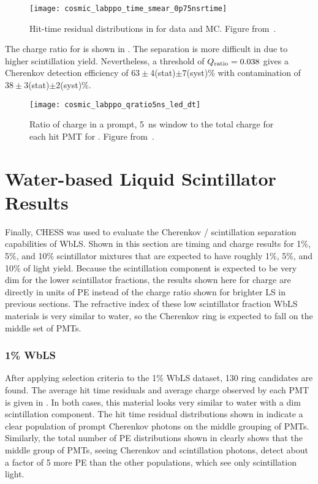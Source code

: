 \begin{figure}
	\centering
	\texttt{[image: cosmic\_labppo\_time\_smear\_0p75nsrtime]}
	\caption{Hit-time residual distributions in {\labppo} for data and MC. Figure from~\cite{chess_lab}.}
	\label{fig:labppo}
\end{figure}

The charge ratio for {\labppo} is shown in . 
The separation is more difficult in {\labppo} due to higher scintillation yield.  
Nevertheless, a threshold of $Q_{\rm ratio}=0.038$ gives a Cherenkov detection efficiency of $63\pm4$(stat)$\pm7$(syst)\% with contamination of $38\pm3$(stat)$\pm2$(syst)\%.

\begin{figure}
	\centering
	\texttt{[image: cosmic\_labppo\_qratio5ns\_led\_dt]}
	\caption{Ratio of charge in a prompt, 5~ns window to the total charge for each hit PMT for {\labppo}. Figure from~\cite{chess_lab}.}
	\label{f:labppoQ}
\end{figure}

\clearpage

\section{Water-based Liquid Scintillator Results}
\label{sec:wbls}

Finally, CHESS was used to evaluate the Cherenkov / scintillation separation capabilities of WbLS.
Shown in this section are timing and charge results for 1\%, 5\%, and 10\% scintillator mixtures that are expected to have roughly 1\%, 5\%, and 10\% of {\labppo} light yield.
Because the scintillation component is expected to be very dim for the lower scintillator fractions, the results shown here for charge are directly in units of PE instead of the charge ratio shown for brighter LS in previous sections.
The refractive index of these low scintillator fraction WbLS materials is very similar to water, so the Cherenkov ring is expected to fall on the middle set of PMTs.

\subsubsection{1\% WbLS}

After applying selection criteria to the 1\% WbLS dataset, 130 ring candidates are found.
The average hit time residuals and average charge observed by each PMT is given in .
In both cases, this material looks very similar to water with a dim scintillation component.
The hit time residual distributions shown in  indicate a clear population of prompt Cherenkov photons on the middle grouping of PMTs.
Similarly, the total number of PE distributions shown in  clearly shows that the middle group of PMTs, seeing Cherenkov and scintillation photons, detect about a factor of 5 more PE than the other populations, which see only scintillation light.

